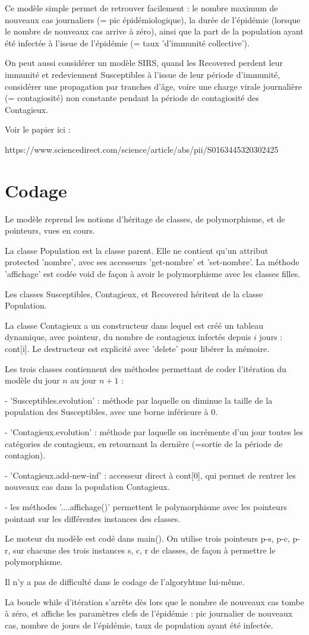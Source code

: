 \documentclass[french]{article}
\begin{document}
Ce modèle simple permet de retrouver facilement : le nombre maximum de nouveaux cas journaliers (= pic épidémiologique), la durée de l'épidémie (lorsque le nombre de nouveaux cas arrive à zéro), ainsi que la part de la population ayant été infectée à l'issue de l'épidémie (= taux 'd'immunité collective').

On peut aussi considérer un modèle SIRS, quand les Recovered perdent leur immunité et redeviennent Susceptibles à l'issue de leur période d'immunité, considérer une propagation par tranches d'âge, voire une charge virale journalière (= contagiosité) non constante pendant la période de contagiosité des Contagieux.

Voir le papier ici : 

https://www.sciencedirect.com/science/article/abs/pii/S0163445320302425


\section{Codage}

Le modèle reprend les notions d'héritage de classes, de polymorphisme, et de pointeurs, vues en cours.

La classe Population est la classe parent. Elle ne contient qu'un attribut protected 'nombre', avec ses accesseurs 'get-nombre' et 'set-nombre'.  La méthode 'affichage' est codée void de façon à avoir le polymorphisme avec les classes filles.

Les classes Susceptibles, Contagieux, et Recovered héritent de la classe Population. 

La classe Contagieux a un constructeur dans lequel est créé un tableau dynamique, avec pointeur, du nombre de contagieux infectés depuis $i$ jours : cont[i].  Le destructeur est explicité avec 'delete' pour libérer la mémoire.

Les trois classes contiennent des méthodes permettant de coder l'itération du modèle du jour $n$ au jour $n+1$ :

- 'Susceptibles.evolution' : méthode par laquelle on diminue la taille de la population des Susceptibles, avec une borne inférieure à 0.

- 'Contagieux.evolution' : méthode par laquelle on incrémente d'un jour toutes les catégories de contagieux, en retournant la dernière (=sortie de la période de contagion).

- 'Contagieux.add-new-inf' : accesseur direct à cont[0], qui permet de rentrer les nouveaux cas dans la population Contagieux.

- les méthodes '....affichage()' permettent le polymorphisme avec les pointeurs pointant sur les différentes instances des classes.

Le moteur du modèle est codé dans main().  On utilise trois pointeurs p-s, p-c, p-r, sur chacune des trois instances s, c, r de classes, de façon à permettre le polymorphisme.

Il n'y a pas de difficulté dans le codage de l'algoryhtme lui-même.

La boucle while d'itération s'arrête dès lors que le nombre de nouveaux cas tombe à zéro, et affiche les paramètres clefs de l'épidémie : pic journalier de nouveaux cas, nombre de jours de l'épidémie, taux de population ayant été infectée.
\end{document}

